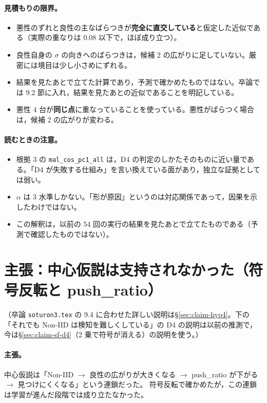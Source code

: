 \documentclass[a4j, dvipdfmx]{jsarticle}  %
\begin{document}
\paragraph{見積もりの限界。}
\begin{itemize}
  \item 悪性のずれと良性の主なばらつきが\textbf{完全に直交している}と仮定した近似である（実際の重なりは 0.08 以下で，ほぼ成り立つ）。
  \item 良性自身の $\sigma$ の向きへのばらつきは，候補 2 の広がりに足していない。厳密には境目は少し小さめにずれる。
  \item 結果を見たあとで立てた計算であり，予測で確かめたものではない。卒論では 9.2 節に入れ，結果を見たあとの近似であることを明記している。
  \item 悪性 4 台が\textbf{同じ点}に重なっていることを使っている。悪性がばらつく場合は，候補 2 の広がりが変わる。
\end{itemize}

\paragraph{読むときの注意。}
\begin{itemize}
  \item 根拠 3 の \texttt{mal\_cos\_pc1\_all} は，D4 の判定のしかたそのものに近い量である。「D4 が失敗する仕組み」を言い換えている面があり，独立な証拠としては弱い。
  \item $\alpha$ は 3 水準しかない。「形が原因」というのは対応関係であって，因果を示したわけではない。
  \item この解釈は，以前の 54 回の実行の結果を見たあとで立てたものである（予測で確認したものではない）。
\end{itemize}

\section{主張：中心仮説は支持されなかった（符号反転と push\_ratio）}
\label{sec:claim-hyp}

（卒論 \texttt{soturon3.tex} の 9.4 に合わせた詳しい説明は\S\ref{sec:claim-hyp4}。下の「それでも Non-IID は検知を難しくしている」の D4 の説明は以前の推測で，今は\S\ref{sec:claim-sf-d4}（2 乗で符号が消える）の説明を使う。）

\paragraph{主張。}
中心仮説は「Non-IID $\to$ 良性の広がりが大きくなる $\to$ push\_ratio が下がる $\to$ 見つけにくくなる」という連鎖だった。
符号反転で確かめたが，この連鎖は学習が進んだ段階では成り立たなかった。
\end{document}
